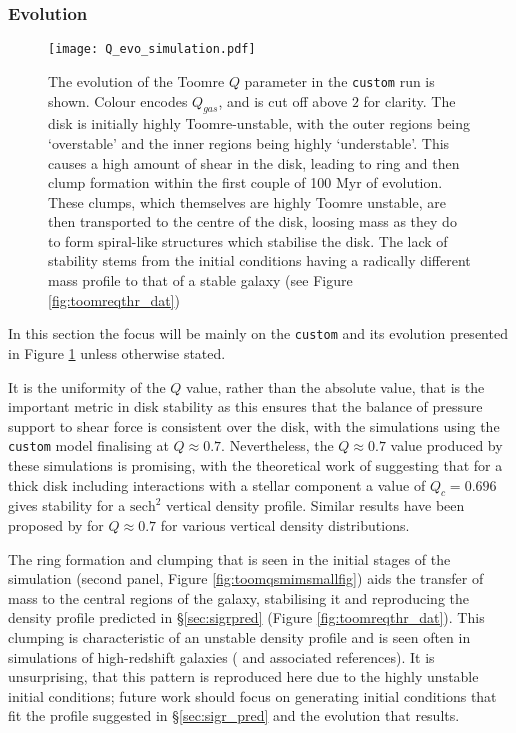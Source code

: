 \subsubsection{Evolution}

\begin{figure}[!ht]
    \texttt{[image: Q\_evo\_simulation.pdf]}
    \caption{The evolution of the Toomre $Q$ parameter in the {\tt custom} run is shown. Colour encodes $Q_{gas}$, and is cut off above $2$ for clarity. The disk is initially highly Toomre-unstable, with the outer regions being `overstable' and the inner regions being highly `understable'. This causes a high amount of shear in the disk, leading to ring and then clump formation within the first couple of 100 Myr of evolution. These clumps, which themselves are highly Toomre unstable, are then transported to the centre of the disk, loosing mass as they do to form spiral-like structures which stabilise the disk. The lack of stability stems from the initial conditions having a radically different mass profile to that of a stable galaxy (see Figure \ref{fig:toomreqthr_dat})}
    \label{fig:toomqsimsmallfig}
\end{figure}

In this section the focus will be mainly on the {\tt custom} and its evolution presented in Figure \ref{fig:toomqsimsmallfig} unless otherwise stated.

It is the uniformity of the $Q$ value, rather than the absolute value, that is the important metric in disk stability as this ensures that the balance of pressure support to shear force is consistent over the disk, with the simulations using the {\tt custom} model finalising at $Q \approx 0.7$.
Nevertheless, the $Q\approx 0.7$ value produced by these simulations is promising, with the theoretical work of \citet{behrendt_structure_2015} suggesting that for a thick disk including interactions with a stellar component a value of $Q_c = 0.696$ gives stability for a $\mathrm{sech}^2$ vertical density profile.
Similar results have been proposed by \citet{kim_three-dimensional_2002, wang_equlibrium_2010} for $Q \approx 0.7$ for various vertical density distributions.

The ring formation and clumping that is seen in the initial stages of the simulation (second panel, Figure \ref{fig:toomqsmimsmallfig}) aids the transfer of mass to the central regions of the galaxy, stabilising it and reproducing the density profile predicted in \S\ref{sec:sigrpred} (Figure \ref{fig:toomreqthr_dat}).
This clumping is characteristic of an unstable density profile and is seen often in simulations of high-redshift galaxies (\citet{bournaud_bulge_2016} and associated references).
It is unsurprising, that this pattern is reproduced here due to the highly unstable initial conditions; future work should focus on generating initial conditions that fit the profile suggested in \S \ref{sec:sigr_pred} and the evolution that results.


